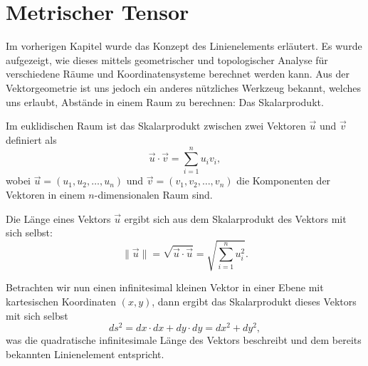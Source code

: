 %
%
%
\section{Metrischer Tensor
\label{geodaeten:section:MetrischerTensor}}

Im vorherigen Kapitel wurde das Konzept des Linienelements erläutert.
Es wurde aufgezeigt, wie dieses mittels geometrischer und topologischer Analyse für verschiedene Räume und Koordinatensysteme berechnet werden kann.
Aus der Vektorgeometrie ist uns jedoch ein anderes nützliches Werkzeug bekannt, welches uns erlaubt, Abstände in einem Raum zu berechnen: Das Skalarprodukt.

Im euklidischen Raum ist das Skalarprodukt zwischen zwei Vektoren $\vec{u}$ und $\vec{v}$ definiert als
\begin{equation}
	\vec{u} \cdot \vec{v} = \sum_{i=1}^n u_i v_i,
\end{equation}
wobei $\vec{u} = (u_1, u_2, \ldots, u_n)$ und $\vec{v} = (v_1, v_2, \ldots, v_n)$ die Komponenten der Vektoren in einem $n$-dimensionalen Raum sind.

Die Länge eines Vektors $\vec{u}$ ergibt sich aus dem Skalarprodukt des Vektors mit sich selbst:
\begin{equation}
	\|\vec{u}\| = \sqrt{\vec{u} \cdot \vec{u}} = \sqrt{\sum_{i=1}^n u_i^2}. 
\end{equation}

Betrachten wir nun einen infinitesimal kleinen Vektor in einer Ebene mit kartesischen Koordinaten $(x, y)$, dann ergibt das Skalarprodukt dieses Vektors mit sich selbst
\begin{equation}
	ds^2 = dx \cdot dx + dy \cdot dy = dx^2 + dy^2,
\end{equation}
was die quadratische infinitesimale Länge des Vektors beschreibt und dem bereits bekannten Linienelement entspricht.

